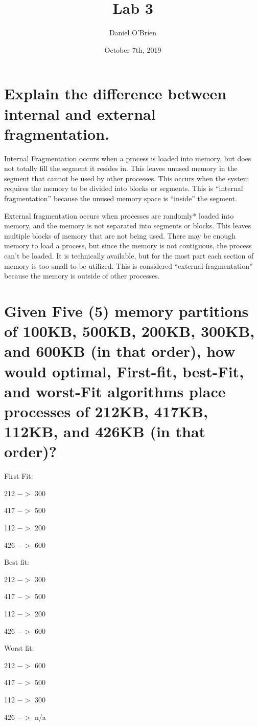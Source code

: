 \documentclass{article}
\title{Lab 3}
\author{Daniel O'Brien}
\date{October 7th, 2019}
\begin{document}
\maketitle

\section{Explain the difference between internal and external fragmentation.}

Internal Fragmentation occurs when a process is loaded into memory, but does not totally fill the segment it resides in. This leaves unused memory in the segment that cannot be used by other processes. This occurs when the system requires the memory to be divided into blocks or segments. This is “internal fragmentation” because the unused memory space is “inside” the segment. 

External fragmentation occurs when processes are randomly* loaded into memory, and the memory is not separated into segments or blocks. This leaves multiple blocks of memory that are not being used. There may be enough memory to load a process, but since the memory is not contiguous, the process can’t be loaded. It is technically available, but for the most part each section of memory is too small to be utilized. This is considered “external fragmentation” because the memory is outside of other processes. 


\section{Given Five (5) memory partitions of 100KB, 500KB, 200KB, 300KB, and 600KB (in that order), how would optimal, First-fit, best-Fit, and worst-Fit algorithms place processes of 212KB, 417KB, 112KB, and 426KB (in that order)?}

First Fit:

		212 $->$ 300
		
		417 $->$ 500
		
		112 $->$ 200
		
		426 $->$ 600
		
\break
		
Best fit:

		212 $->$ 300
		
		417 $->$ 500
		
		112 $->$ 200
		
		426 $->$ 600

Worst fit:

		212 $->$ 600
		
		417 $->$ 500
		
		112 $->$ 300
		
		426 $->$ n/a
\end{document}
